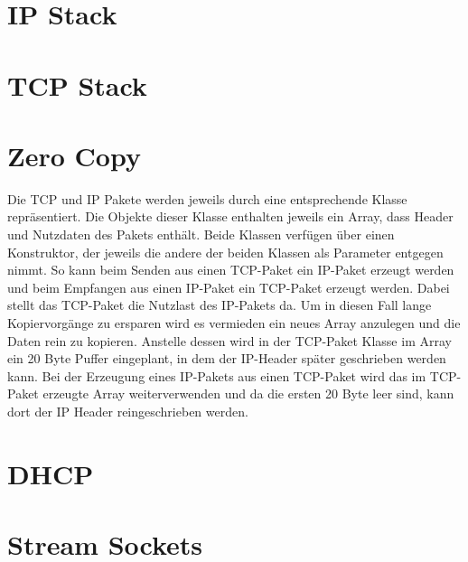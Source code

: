 \section{IP Stack}

\section{TCP Stack}

\section{Zero Copy}
Die TCP und IP Pakete werden jeweils durch eine entsprechende Klasse repräsentiert. Die Objekte dieser Klasse enthalten jeweils ein Array, dass Header und Nutzdaten des Pakets enthält. Beide Klassen verfügen über einen Konstruktor, der jeweils die andere der beiden Klassen als Parameter entgegen nimmt. So kann beim Senden aus einen TCP-Paket ein IP-Paket erzeugt werden und beim Empfangen aus einen IP-Paket ein TCP-Paket erzeugt werden. Dabei stellt das TCP-Paket die Nutzlast des IP-Pakets da. Um in diesen Fall lange Kopiervorgänge zu ersparen wird es vermieden ein neues Array anzulegen und die Daten rein zu kopieren. Anstelle dessen wird in der TCP-Paket Klasse im Array ein 20 Byte Puffer eingeplant, in dem der IP-Header später geschrieben werden kann. Bei der Erzeugung eines IP-Pakets aus einen TCP-Paket wird das im TCP-Paket erzeugte Array weiterverwenden und da die ersten 20 Byte leer sind, kann dort der IP Header reingeschrieben werden. 


\section{DHCP}

\section{Stream Sockets}

